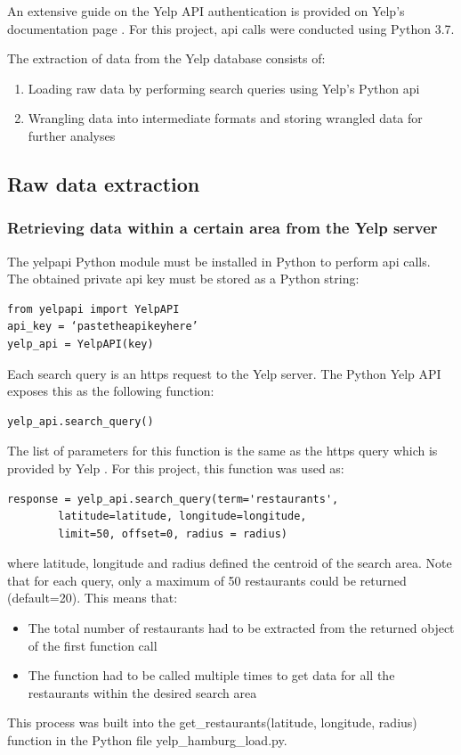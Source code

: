 \documentclass[a4paper, 11pt, oneside]{Thesis}  %
\begin{document}
An extensive guide on the Yelp API authentication is provided on Yelp’s documentation page \cite{Yelp.Fusion.Authentication}.
For this project, \ac{api} calls were conducted using Python 3.7.

The extraction of data from the Yelp database consists of:
\begin{enumerate}
\item Loading raw data by performing search queries using Yelp’s Python \ac{api}
\item Wrangling data into intermediate formats and storing wrangled data for further analyses
\end{enumerate}

\subsection{Raw data extraction}

\subsubsection{Retrieving data within a certain area from the Yelp server}
\label{retrieving_data_within_a_certain_area}

The yelpapi Python module \cite{GeoffreyFairchild.11.07.2018} must be installed in Python to perform \ac{api} calls. The obtained private \ac{api} key must be stored as a Python string:

\begin{verbatim}
from yelpapi import YelpAPI
api_key = ‘pastetheapikeyhere’
yelp_api = YelpAPI(key)
\end{verbatim}

Each search query is an https request to the Yelp server. The Python Yelp API exposes this as the following function:
\begin{verbatim}
yelp_api.search_query()
\end{verbatim}

The list of parameters for this function is the same as the https query which is provided by Yelp \cite{yelp.businesses.search}. For this project, this function was used as:
\begin{verbatim}
response = yelp_api.search_query(term='restaurants',
	 	latitude=latitude, longitude=longitude, 
		limit=50, offset=0, radius = radius)
\end{verbatim}
where latitude, longitude and radius defined the centroid of the search area.
Note that for each query, only a maximum of 50 restaurants could be returned (default=20). This means that:
\begin{itemize}
\item The total number of restaurants had to be extracted from the returned object of the first function call
\item The function had to be called multiple times to get data for all the restaurants within the desired search area
\end{itemize}
This process was built into the get\_restaurants(latitude, longitude, radius) function in the Python file yelp\_hamburg\_load.py.
\end{document}
